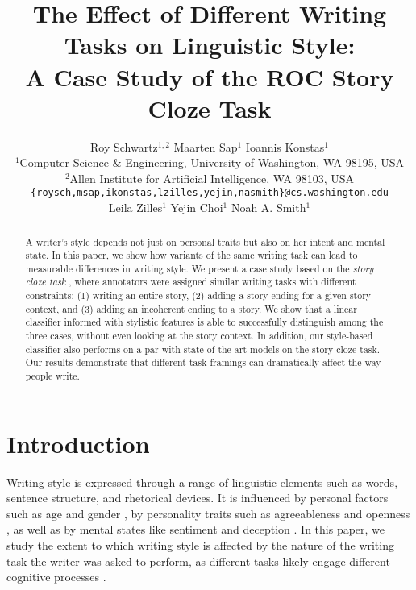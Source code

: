 \documentclass[11pt,a4paper]{article}
\title{The Effect of Different Writing Tasks on Linguistic Style:\\ A Case Study of the ROC Story Cloze Task}
\author{\hspace{2cm}Roy Schwartz$^{1,2}$ \And \hspace{2.5cm}Maarten Sap$^1$ \And \hspace{3cm}Ioannis Konstas$^1$ \And \\
  $^1$Computer Science \& Engineering, University of Washington, WA 98195, USA \\
  $^2$Allen Institute for Artificial Intelligence, WA 98103, USA \\
    {\tt \{roysch,msap,ikonstas,lzilles,yejin,nasmith\}@cs.washington.edu}  \\
    \And \hspace{-2cm}Leila Zilles$^1$ \And \hspace{-2.5cm}Yejin Choi$^1$ \And \hspace{-2.5cm}Noah A. Smith$^1$ \\
  }
\date{}
\newcommand{\resolved}[1]{}
\newcommand{\shortv}[1]{}
\newcommand{\roy}[1]{{\color{orange}\textsc{[#1 --rs]}}}
\newcommand{\nascomment}[1]{{\color{blue}\textsc{[#1 --nas]}}}
\newcommand{\clinic}[1]{{\color{magenta}\textsc{[#1 --CLINIC]}}}
\renewcommand{\roy}[1]{{\color{orange}[#1 --rs]}}
\renewcommand{\roy}[1]{#1}
\renewcommand{\nascomment}[1]{}
\begin{document}
\maketitle
\begin{abstract}
A writer's style depends not just on personal traits but also on her intent and mental state.
In this paper, we show how variants of the same writing task can lead to measurable differences in writing style.
We present a case study based on 
the  {\it story cloze task} \cite{Mostafazadeh:2016},
where annotators were assigned similar writing tasks with different constraints: (1) writing an entire story, (2) adding a story ending for a given story context, and (3) adding an incoherent ending to a story.\resolved{\clinic{Many felt these 2 constraints looks like 3 constraints. clarify}}
We show that a  linear classifier informed with stylistic features is able to successfully distinguish among the three cases, without even looking at the story context.
\roy{In addition, our style-based classifier also performs on a par with state-of-the-art models on the story cloze task.} 
Our results demonstrate that different task framings can dramatically affect the way people write.\resolved{\clinic{Similarly to previous comment: which results does this comment address?}}


\resolved{They also provide important lessons for designing new NLP
tasks. \nascomment{drop this sentence if we only have a paragraph
  about this at the end, as we currently do}}

\end{abstract}

\section{Introduction}
Writing style is expressed through a range of linguistic elements such as words, sentence structure, and rhetorical devices.
It is influenced by personal factors such as age and gender \cite{Schler:2006}, 
by personality traits such as agreeableness and openness  \cite{Ireland:2014b},
as well as by mental states\resolved{\clinic{Avoid using ``cognitive"?}} like sentiment \cite{Davidov:2010}\shortv{, sarcasm \cite{Tsur:2010},} and deception \cite{Feng:2012}.  
In this paper, we study the extent to which writing style is affected by the nature of the writing task the writer was asked to perform, as
different tasks likely engage different cognitive processes \cite{Campbell:2003,Banerjee:2014}.
\end{document}
